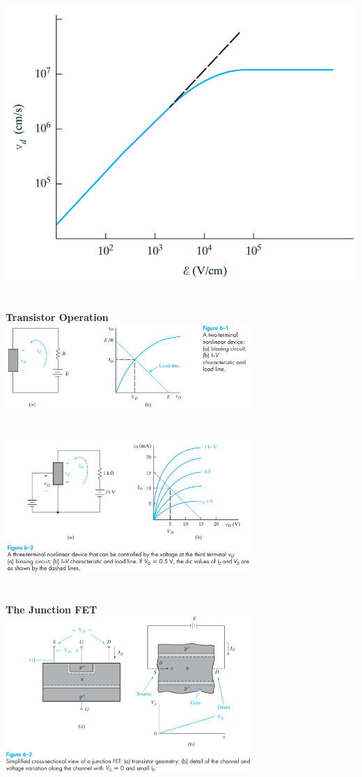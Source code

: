 \documentclass[8pt]{article}
\newcommand{\sect}[1]{\noindent\textbf{#1}\\}
\newcommand{\hl}{\noindent\makebox[\linewidth]{\rule{\textwidth}{0.2pt}}}
\begin{document}
\begin{center}
		\includegraphics[width=\textwidth]{fig3} \\ \hl \\~\\
		\sect{\Large{Transistor Operation}}
		\includegraphics[width=0.7\textwidth]{fig6-1} \\ \hl \\~\\
		\includegraphics[width=0.7\textwidth]{fig6-2} \\ \hl \\~\\
		\sect{\Large{The Junction FET}}
		\includegraphics[width=0.7\textwidth]{fig6-3} \\ \hl \\~\\

\end{center}
\end{document}
